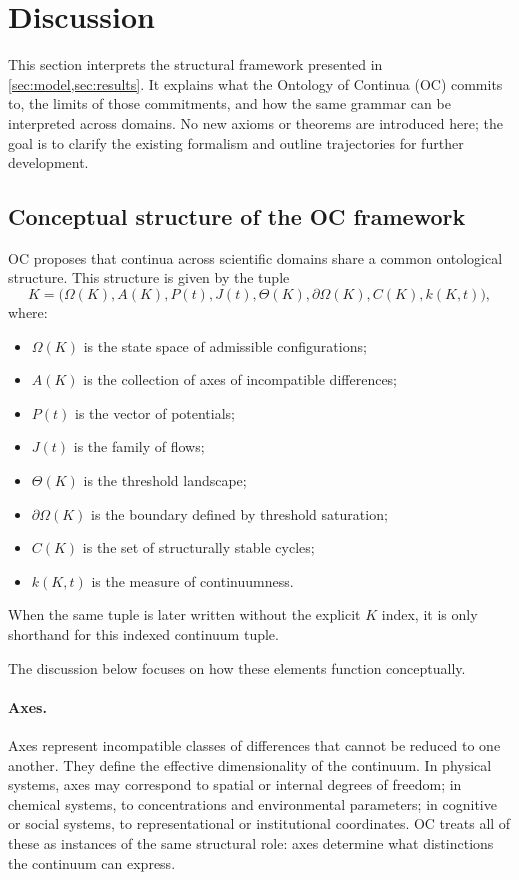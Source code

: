 
\section{Discussion}
\label{sec:discussion}

This section interprets the structural framework presented in
\cref{sec:model,sec:results}. It explains what the Ontology of
Continua (OC) commits to, the limits of those commitments, and how the same
grammar can be interpreted across domains.
No new axioms or theorems are introduced here; the goal is to clarify the
existing formalism and outline trajectories for further development.

\subsection{Conceptual structure of the OC framework}

OC proposes that continua across scientific domains share a common ontological structure.
This structure is given by the tuple
\[
  K = \big(\Omega(K), A(K), P(t), J(t), \Theta(K), \partial\Omega(K), C(K), k(K,t)\big),
\]
where:
\begin{itemize}
    \item \(\Omega(K)\) is the state space of admissible configurations;
    \item \(A(K)\) is the collection of axes of incompatible differences;
    \item \(P(t)\) is the vector of potentials;
    \item \(J(t)\) is the family of flows;
    \item \(\Theta(K)\) is the threshold landscape;
    \item \(\partial\Omega(K)\) is the boundary defined by threshold saturation;
    \item \(C(K)\) is the set of structurally stable cycles;
    \item \(k(K,t)\) is the measure of continuumness.
\end{itemize}
When the same tuple is later written without the explicit \(K\) index, it is
only shorthand for this indexed continuum tuple.

The discussion below focuses on how these elements function conceptually.

\paragraph{Axes.}
Axes represent incompatible classes of differences that cannot be reduced to one another.
They define the effective dimensionality of the continuum.
In physical systems, axes may correspond to spatial or internal degrees of freedom; 
in chemical systems, to concentrations and environmental parameters; 
in cognitive or social systems, to representational or institutional coordinates.
OC treats all of these as instances of the same structural role: axes determine what distinctions the continuum can express.

